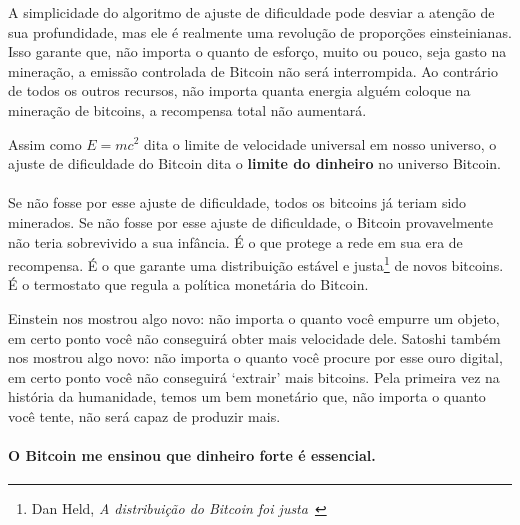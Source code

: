 A simplicidade do algoritmo de ajuste de dificuldade pode desviar a atenção de sua profundidade, mas ele é realmente uma revolução de proporções einsteinianas. Isso garante que, não importa o quanto de esforço, muito ou pouco, seja gasto na mineração, a emissão controlada de Bitcoin não será interrompida. Ao contrário de todos os outros recursos, não importa quanta energia alguém coloque na mineração de bitcoins, a recompensa total não aumentará.

Assim como $E=mc^2$ dita o limite de velocidade universal em nosso universo, o ajuste de dificuldade do Bitcoin dita o \textbf{limite do dinheiro} no universo Bitcoin.

\paragraph{}
Se não fosse por esse ajuste de dificuldade, todos os bitcoins já teriam sido minerados. Se não fosse por esse ajuste de dificuldade, o Bitcoin provavelmente não teria sobrevivido a sua infância. É o que protege a rede em sua era de recompensa. É o que garante uma distribuição estável e justa\footnote{Dan Held, \textit{A distribuição do Bitcoin foi justa}~\cite{distribution-was-fair}} de novos bitcoins. É o termostato que regula a política monetária do Bitcoin.

Einstein nos mostrou algo novo: não importa o quanto você empurre um objeto, em certo ponto você não conseguirá obter mais velocidade dele. Satoshi também nos mostrou algo novo: não importa o quanto você procure por esse ouro digital, em certo ponto você não conseguirá `extrair' mais bitcoins. Pela primeira vez na história da humanidade, temos um bem monetário que, não importa o quanto você tente, não será capaz de produzir mais.

\paragraph{O Bitcoin me ensinou que dinheiro forte é essencial.}

